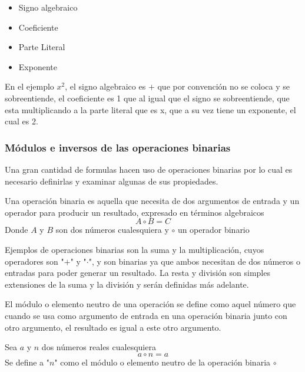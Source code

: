 \documentclass[11pt,letterpaper]{article}
\begin{document}
	\begin{itemize}
		\item Signo algebraico
		\item Coeficiente
		\item Parte Literal
		\item Exponente
	\end{itemize}
	
	En el ejemplo $x^2$, el signo algebraico es $+$ que por convención no se coloca y se sobreentiende, el coeficiente es 1 que al igual que el signo se sobreentiende, que esta multiplicando a la parte literal que es x, que a su vez tiene un exponente, el cual es 2.
	
	\subsubsection{Módulos e inversos de las operaciones binarias}
	
	Una gran cantidad de formulas hacen uso de operaciones binarias por lo cual es necesario definirlas y examinar algunas de sus propiedades.
	
	\begin{definición}
		Una operación binaria es aquella que necesita de dos argumentos de entrada y un operador para producir un resultado, expresado en términos algebraicos
		\begin{equation}
			A \circ B = C
		\end{equation}
		Donde $A$ y $B$ son dos números cualesquiera y $\circ$ un operador binario
	\end{definición}

	Ejemplos de operaciones binarias son la suma y la multiplicación, cuyos operadores son "$+$" y "$\cdot$", y son binarias ya que ambos necesitan de dos números o entradas para poder generar un resultado. La resta y división son simples extensiones de la suma y la división y serán definidas más adelante.
	
	El módulo o elemento neutro de una operación se define como aquel número que cuando se usa como argumento de entrada en una operación binaria junto con otro argumento, el resultado es igual a este otro argumento.
	
	\begin{definición} \label{def:aria}
		Sea $a$ y $n$ dos números reales cualesquiera  
		\begin{equation}
			a \circ n = a \label{ec:aria}
		\end{equation}
		Se define a "$n$" como el módulo o elemento neutro de la operación binaria $\circ$
	\end{definición}
	
\end{document}
